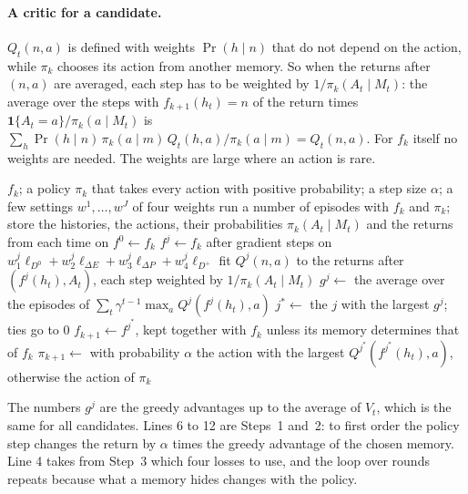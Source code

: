 \documentclass[11pt]{article}
\theoremstyle{definition}
\newcommand{\dE}{\Delta E}
\newcommand{\dP}{\Delta P}
\begin{document}
\paragraph{A critic for a candidate.} $Q_t(n,a)$ is defined with weights $\Pr(h\mid n)$ that do not depend on the action, while $\pi_k$ chooses its action from another memory. So when the returns after $(n,a)$ are averaged, each step has to be weighted by $1/\pi_k(A_t\mid M_t)$: the average over the steps with $f_{k+1}(h_t)=n$ of the return times $\mathbf 1\{A_t=a\}/\pi_k(a\mid M_t)$ is $\sum_h\Pr(h\mid n)\,\pi_k(a\mid m)\,Q_t(h,a)/\pi_k(a\mid m)=Q_t(n,a)$. For $f_k$ itself no weights are needed. The weights are large where an action is rare.

\begin{algorithm}[h]
\caption{One round of the agent}\label{alg:round}
\begin{algorithmic}[1]
\Require $f_k$; a policy $\pi_k$ that takes every action with positive probability; a step size $\alpha$; a few settings $w^1,\dots,w^J$ of four weights
\State run a number of episodes with $f_k$ and $\pi_k$; store the histories, the actions, their probabilities $\pi_k(A_t\mid M_t)$ and the returns from each time on
\State $f^0\gets f_k$
 
  \State $f^j\gets f_k$ after gradient steps on $w^j_1\ell_{D^0}+w^j_2\ell_{\dE}+w^j_3\ell_{\dP}+w^j_4\ell_{D^+}$
\EndFor
{} 
  \State fit $Q^j(n,a)$ to the returns after $(f^j(h_t),A_t)$, each step weighted by $1/\pi_k(A_t\mid M_t)$
  \State $g^j\gets$ the average over the episodes of $\sum_t\gamma^{t-1}\max_aQ^j(f^j(h_t),a)$
\EndFor
\State $j^*\gets$ the $j$ with the largest $g^j$; ties go to $0$ 
\State $f_{k+1}\gets f^{j^*}$, kept together with $f_k$ unless its memory determines that of $f_k$
\State $\pi_{k+1}\gets$ with probability $\alpha$ the action with the largest $Q^{j^*}(f^{j^*}(h_t),a)$, otherwise the action of $\pi_k$
\end{algorithmic}
\end{algorithm}

The numbers $g^j$ are the greedy advantages up to the average of $V_t$, which is the same for all candidates. Lines 6 to 12 are Steps~1 and~2: to first order the policy step changes the return by $\alpha$ times the greedy advantage of the chosen memory. Line 4 takes from Step~3 which four losses to use, and the loop over rounds repeats because what a memory hides changes with the policy.
\end{document}
